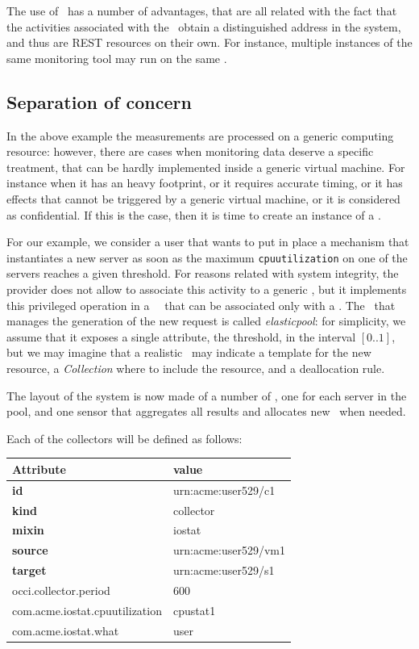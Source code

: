 \documentclass[10pt]{article}  %
\begin{document}
The use of \coll\ has a number of advantages, that are all related with the fact that the activities associated with the \mi\ obtain a distinguished address in the system, and thus are REST resources on their own. For instance, multiple instances of the same monitoring tool may run on the same \rs .

\subsection*{Separation of concern}

In the above example the measurements are processed on a generic computing resource: however, there are cases when monitoring data deserve a specific treatment, that can be hardly implemented inside a generic virtual machine. For instance when it has an heavy footprint, or it requires accurate timing, or it has effects that cannot be triggered by a generic virtual machine, or it is considered as confidential. If this is the case, then it is time to create an instance of a \sens .

For our example, we consider a user that wants to put in place a mechanism that instantiates a new server as soon as the maximum {\tt \small cpuutilization} on one of the servers reaches a given threshold. For reasons related with system integrity, the provider does not allow to associate this activity to a generic \rs , but it implements this privileged operation in a \publ\ \mi\ that can be associated only with a \sens . The \mi\ that manages the generation of the new request is called {\em elasticpool}: for simplicity, we assume that it exposes a single attribute, the threshold, in the interval $[0..1]$, but we may imagine that a realistic \mi\ may indicate a template for the new resource, a {\em Collection} where to include the resource, and a deallocation rule.

The layout of the system is now made of a number of \coll , one for each server in the pool, and one sensor that aggregates all results and allocates new \comp\ when needed.

Each of the collectors will be defined as follows:

{
\small
\begin{tabular}{l|l}
Attribute                         & value \\ \hline
{\bf id}                          & urn:acme:user529/c1 \\
{\bf kind}                        & collector \\
{\bf mixin}                       & iostat    \\
{\bf source}                      & urn:acme:user529/vm1 \\
{\bf target}                      & urn:acme:user529/s1  \\
occi.collector.period             & 600   \\
com.acme.iostat.cpuutilization    & cpustat1   \\                     
com.acme.iostat.what              & user  \\
\end{tabular}
}
\end{document}
